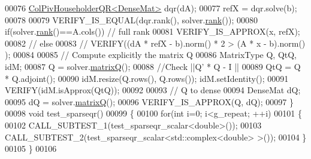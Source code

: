 \begin{DoxyCode}
00076   \hyperlink{group___q_r___module_class_eigen_1_1_col_piv_householder_q_r}{ColPivHouseholderQR<DenseMat>} dqr(dA);
00077   refX = dqr.solve(b);
00078   
00079   VERIFY\_IS\_EQUAL(dqr.rank(), solver.\hyperlink{group___sparse_q_r___module_a70ec2b9e5cb62a41dc1ee2adfb54e9b0}{rank}());
00080   \textcolor{keywordflow}{if}(solver.\hyperlink{group___sparse_q_r___module_a70ec2b9e5cb62a41dc1ee2adfb54e9b0}{rank}()==A.cols()) \textcolor{comment}{// full rank}
00081     VERIFY\_IS\_APPROX(x, refX);
00082 \textcolor{comment}{//   else}
00083 \textcolor{comment}{//     VERIFY((dA * refX - b).norm() * 2 > (A * x - b).norm() );}
00084 
00085   \textcolor{comment}{// Compute explicitly the matrix Q}
00086   MatrixType Q, QtQ, idM;
00087   Q = solver.\hyperlink{group___sparse_q_r___module_ae1cc0a836c177d4f42600f8639354be1}{matrixQ}();
00088   \textcolor{comment}{//Check  ||Q' * Q - I ||}
00089   QtQ = Q * Q.adjoint();
00090   idM.resize(Q.rows(), Q.rows()); idM.setIdentity();
00091   VERIFY(idM.isApprox(QtQ));
00092   
00093   \textcolor{comment}{// Q to dense}
00094   DenseMat dQ;
00095   dQ = solver.\hyperlink{group___sparse_q_r___module_ae1cc0a836c177d4f42600f8639354be1}{matrixQ}();
00096   VERIFY\_IS\_APPROX(Q, dQ);
00097 \}
00098 \textcolor{keywordtype}{void} test\_sparseqr()
00099 \{
00100   \textcolor{keywordflow}{for}(\textcolor{keywordtype}{int} i=0; i<g\_repeat; ++i)
00101   \{
00102     CALL\_SUBTEST\_1(test\_sparseqr\_scalar<double>());
00103     CALL\_SUBTEST\_2(test\_sparseqr\_scalar<std::complex<double> >());
00104   \}
00105 \}
00106 
\end{DoxyCode}
